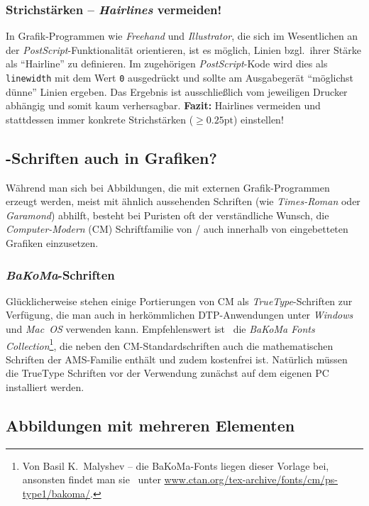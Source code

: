 \subsubsection{Strichstärken -- \emph{Hairlines} vermeiden!}

In Grafik-Programmen wie \emph{Freehand} und \emph{Illustrator},
die sich im Wesentlichen an der \emph{PostScript}-Funktionalität
orientieren, ist es möglich, Linien bzgl.\ ihrer Stärke als
"`Hairline"' zu definieren. Im zugehörigen \emph{PostScript}-Kode
wird dies als \texttt{linewidth} mit dem Wert \texttt{0} ausgedrückt und
sollte am Ausgabegerät "`möglichst dünne"' Linien ergeben. Das
Ergebnis ist ausschließlich vom jeweiligen Drucker
abhängig und somit kaum verhersagbar. 
\textbf{Fazit:} Hairlines vermeiden und stattdessen immer konkrete
Strichstärken ($\geq 0.25 \mathrm{pt}$) einstellen!


\subsection{\tex-Schriften auch in Grafiken?}
\label{sec:tex-schriften-in-grafiken}

Während man sich bei Abbildungen, die mit externen
Grafik-Programmen erzeugt werden, meist mit ähnlich aussehenden
Schriften (wie \emph{Times-Roman} oder \emph{Garamond}) abhilft,
besteht bei Puristen oft der verständliche Wunsch, die 
\emph{Computer-Modern} (CM) Schriftfamilie von {\tex}/{\latex} auch
innerhalb von eingebetteten Grafiken einzusetzen.

\subsubsection{\emph{BaKoMa}-Schriften}

Glücklicherweise stehen einige Portierungen von CM als {\em
TrueType}-Schriften zur Verfügung, die man auch in herkömmlichen
DTP-Anwendungen unter \emph{Windows} und \emph{Mac~OS} verwenden
kann. Empfehlenswert ist \va\ die \emph{BaKoMa Fonts
Collection}\footnote{Von Basil K.\ Malyshev -- die BaKoMa-Fonts
liegen dieser Vorlage bei, ansonsten findet man sie \zB\ unter
\url{www.ctan.org/tex-archive/fonts/cm/ps-type1/bakoma/}.}, die
neben den CM-Standardschriften auch die mathematischen Schriften
der AMS-Familie ent\-hält und zudem kostenfrei ist. Natürlich
müssen die TrueType Schriften vor der Verwendung zunächst auf dem
eigenen PC installiert werden.


\subsection{Abbildungen mit mehreren Elementen}

